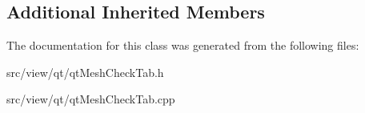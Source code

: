 \subsection*{Additional Inherited Members}


The documentation for this class was generated from the following files\+:\begin{DoxyCompactItemize}
\item 
src/view/qt/qt\+Mesh\+Check\+Tab.\+h\item 
src/view/qt/qt\+Mesh\+Check\+Tab.\+cpp\end{DoxyCompactItemize}

